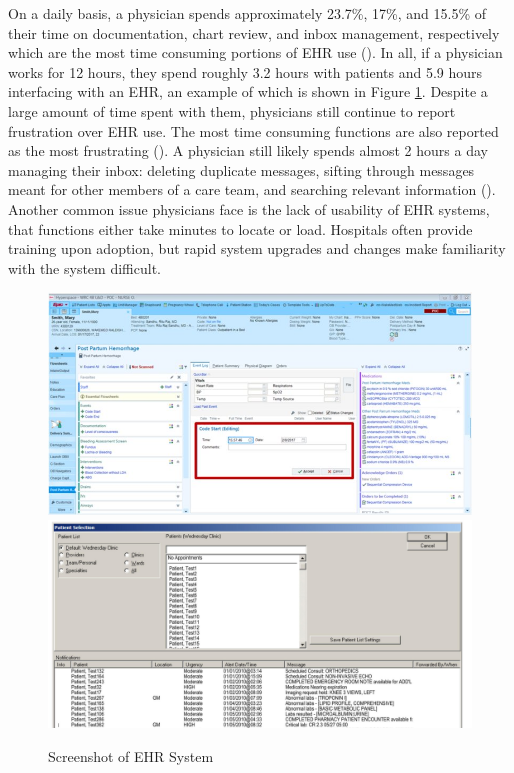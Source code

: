 \documentclass[12pt]{article}
\begin{document}
On a daily basis, a physician spends approximately 23.7\%, 17\%, and 15.5\% of their time on documentation, chart review, and inbox management, respectively which are the most time consuming portions of EHR use (\cite{arndt2017tethered}). In all, if a physician works for 12 hours, they spend roughly 3.2 hours with patients and 5.9 hours interfacing with an EHR, an example of which is shown in Figure \ref{fig:EPIC}. Despite a large amount of time spent with them, physicians still continue to report frustration over EHR use. The most time consuming functions are also reported as the most frustrating (\cite{dymek2021building}). A physician still likely spends almost 2 hours a day managing their inbox: deleting duplicate messages, sifting through messages meant for other members of a care team, and searching relevant information (\cite{dymek2021building}). Another common issue physicians face is the lack of usability of EHR systems, that functions either take minutes to locate or load. Hospitals often provide training upon adoption, but rapid system upgrades and changes make familiarity with the system difficult. 

\begin{figure}[ht]
    \centering
    \captionsetup{width=.4\linewidth}
    \caption{Screenshot of EHR System}
    \includegraphics[scale=.4]{graphics/epic-ehr-screenshot.jpg}
    \includegraphics[scale=.11]{graphics/EHRimage2.jpg}
    \label{fig:EPIC}
\end{figure}
\end{document}
